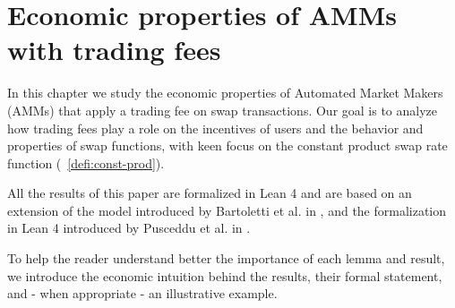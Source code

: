 \chapter{Economic properties of AMMs with trading fees}

In this chapter we study the economic properties of Automated Market Makers (AMMs) that apply a trading fee on swap transactions. Our goal is to analyze how trading fees play a role on the incentives of users and the behavior and properties of swap functions, with keen focus on the constant product swap rate function (~\ref{defi:const-prod}).

All the results of this paper are formalized in Lean 4 and are based on an extension of the model introduced by Bartoletti et al. in \cite{BCL22lmcs}, and the formalization in Lean 4 introduced by Pusceddu et al. in \cite{PB24arxiv}.

To help the reader understand better the importance of each lemma and result, we introduce the economic intuition behind the results, their formal statement, and - when appropriate - an illustrative example. 





\newpage






\newpage


